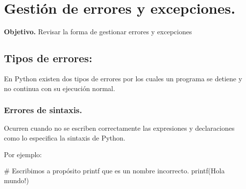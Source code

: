 \documentclass[
  spanish,
  letterpaper,
]{scrbook}
\newenvironment{Shaded}{\begin{snugshade}}{\end{snugshade}}
\newcommand{\CommentTok}[1]{\textcolor[rgb]{0.37,0.37,0.37}{#1}}
\newcommand{\NormalTok}[1]{\textcolor[rgb]{0.00,0.23,0.31}{#1}}
\newcommand{\StringTok}[1]{\textcolor[rgb]{0.13,0.47,0.30}{#1}}
\theoremstyle{definition}
\theoremstyle{remark}
\begin{document}
\chapter{Gestión de errores y
excepciones.}\label{sec-q-errores-excepciones}

\textbf{Objetivo.} Revisar la forma de gestionar errores y excepciones

\section{Tipos de errores:}\label{tipos-de-errores}

En Python existen dos tipos de errores por los cuales un programa se
detiene y no continua con su ejecución normal.

\subsection{Errores de sintaxis.}\label{errores-de-sintaxis.}

Ocurren cuando no se escriben correctamente las expresiones y
declaraciones como lo especifica la sintaxis de Python.

Por ejemplo:

\begin{Shaded}
\begin{Highlighting}[]
\CommentTok{\# Escribimos a propósito \textquotesingle{}printf\textquotesingle{} que es un nombre incorrecto.}
\NormalTok{printf(}\StringTok{\textquotesingle{}Hola mundo!\textquotesingle{}}\NormalTok{)}
\end{Highlighting}
\end{Shaded}
\end{document}
